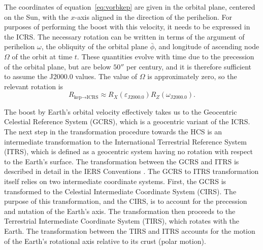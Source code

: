 \documentclass[b5paper, 10pt, twoside]{book}
\begin{document}
The coordinates of equation~\eqref{eq:vorbkep} are given in the orbital plane, centered on the Sun, with the $x$-axis aligned in the direction of the perihelion. For purposes of performing the boost with this velocity, it needs to be expressed in the ICRS. The necessary rotation can be written in terms of the argument of perihelion $\omega$, the obliquity of the orbital plane $\bar{\phi}$, and longitude of ascending node $\Omega$ of the orbit at time $t$. These quantities evolve with time due to the precession of the orbital plane, but are below $50''$ per century, and it is therefore sufficient to assume the J2000.0 values. The value of $\Omega$ is approximately zero, so the relevant rotation is
\begin{equation}
R_{\text{kep}\rightarrow\text{ICRS}}\approx R_X(\varepsilon_\text{J2000.0})R_Z(\omega_\text{J2000.0}).
\end{equation}

The boost by Earth's orbital velocity effectively takes us to the Geocentric Celestial Reference System (GCRS), which is a geocentric variant of the ICRS. The next step in the transformation procedure towards the HCS is an intermediate transformation to the International Terrestrial Reference System (ITRS), which is defined as a geocentric system having no rotation with respect to the Earth's surface. The transformation between the GCRS and ITRS is described in detail in the IERS Conventions \parencite{LuzumPetit2010}. The GCRS to ITRS transformation itself relies on two intermediate coordinate systems. First, the GCRS is transformed to the Celestial Intermediate Coordinate System (CIRS). The purpose of this transformation, and the CIRS, is to account for the precession and nutation of the Earth's axis. The transformation then proceeds to the Terrestrial Intermediate Coordinate System (TIRS), which rotates with the Earth. The transformation between the TIRS and ITRS accounts for the motion of the Earth's rotational axis relative to its crust (polar motion).
\end{document}
